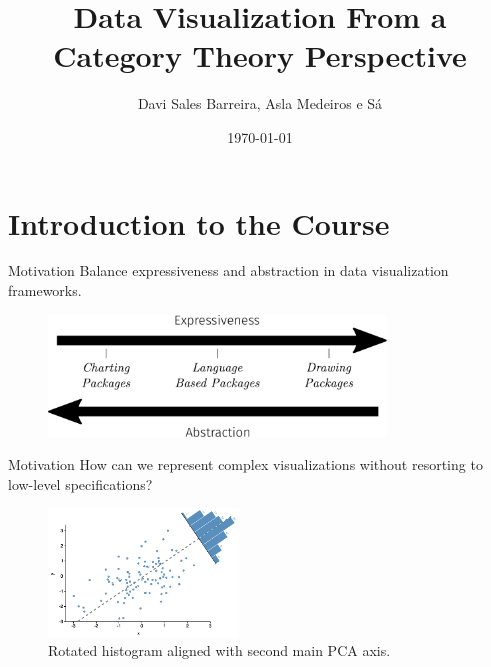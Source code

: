 \documentclass[aspectratio=169,xcolor=dvipsnames,10pt]{beamer}
\title{Data Visualization From a Category Theory Perspective}
\subtitle{}
\author{Davi Sales Barreira, Asla Medeiros e Sá}
\institute
{
    FGV - EMAp, IMPATech
}
\date{\today} %
\begin{document}
\begin{frame}
    \titlepage
\end{frame}

\section{Introduction to the Course}
\begin{frame}[fragile]{Motivation}
  Balance expressiveness and abstraction in data visualization
  frameworks.
	\vspace{3mm}
	\begin{figure}[H]
		\begin{center}
			\includegraphics[width=0.8\textwidth]{./figures/expressiveness.pdf}
		\end{center}
		\label{fig:rotated-histogram}
	\end{figure}
\end{frame}

\begin{frame}[fragile]{Motivation}
    How can we represent complex visualizations without resorting to low-level specifications?
	\vspace{3mm}
	\begin{figure}[H]
		\begin{center}
			\includegraphics[width=0.45\textwidth]{./figs/pca.pdf}
		\end{center}
        \caption{Rotated histogram aligned with second main PCA axis.}
		\label{fig:rotated-histogram}
	\end{figure}
\end{frame}
\end{document}
